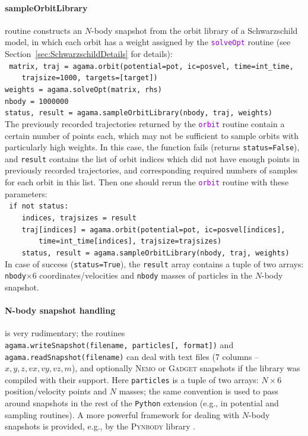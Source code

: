 \documentclass[12pt]{article}
\newcommand{\Nemo} {\textsc{Nemo}\xspace}
\newcommand{\Python}{\texttt{Python}\xspace}
\newcommand{\ttt}[1]{\textcolor{darkviolet}{\texttt{#1}}}
\newcommand{\ppp}[1]{\textcolor{darkolive} {\texttt{#1}}}
\begin{document}
\paragraph{sampleOrbitLibrary} routine constructs an $N$-body snapshot from the orbit library of a Schwarzschild model, in which each orbit has a weight assigned by the \ttt{solveOpt} routine (see Section~\ref{sec:SchwarzschildDetails} for details):\\[1mm]
\texttt{
matrix, traj = agama.orbit(potential=pot, ic=posvel, time=int_time, \\
\mbox{}~~~~trajsize=1000, targets=[target])\\
weights = agama.solveOpt(matrix, rhs)\\
nbody = 1000000\\
status, result = agama.sampleOrbitLibrary(nbody, traj, weights)}\\[2mm]
The previously recorded trajectories returned by the \ttt{orbit} routine contain a certain number of points each, which may not be sufficient to sample orbits with particularly high weights. In this case, the function fails (returns \texttt{status=False}), and \texttt{result} contains the list of orbit indices which did not have enough points in previously recorded trajectories, and corresponding required numbers of samples for each orbit in this list. Then one should rerun the \ttt{orbit} routine with these parameters:\\[1mm]
\texttt{
if not status:\\
\mbox{}~~~~indices, trajsizes = result\\
\mbox{}~~~~traj[indices] = agama.orbit(potential=pot, ic=posvel[indices], \\
\mbox{}~~~~~~~~time=int_time[indices], trajsize=trajsizes)\\
\mbox{}~~~~status, result = agama.sampleOrbitLibrary(nbody, traj, weights)}\\[2mm]
In case of success (\texttt{status=True}), the \texttt{result} array contains a tuple of two arrays: \texttt{nbody}$\times6$ coordinates/velocities and \texttt{nbody} masses of particles in the $N$-body snapshot.

\paragraph{N-body snapshot handling} \label{sec:PythonSnapshot} is very rudimentary; the routines\\
\texttt{agama.writeSnapshot(filename, particles[, format])} and\\ \texttt{agama.readSnapshot(filename)} can deal with text files (7 columns -- $x,y,z,vx,vy,vz,m$), and optionally \Nemo or \textsc{Gadget} snapshots if the library was compiled with their support. Here \ppp{particles} is a tuple of two arrays: $N\times6$ position/velocity points and $N$ masses; the same convention is used to pass around snapshots in the rest of the \Python extension (e.g., in potential and sampling routines). A more powerful framework for dealing with $N$-body snapshots is provided, e.g., by the \textsc{Pynbody} library \cite{Pynbody}.
\end{document}
